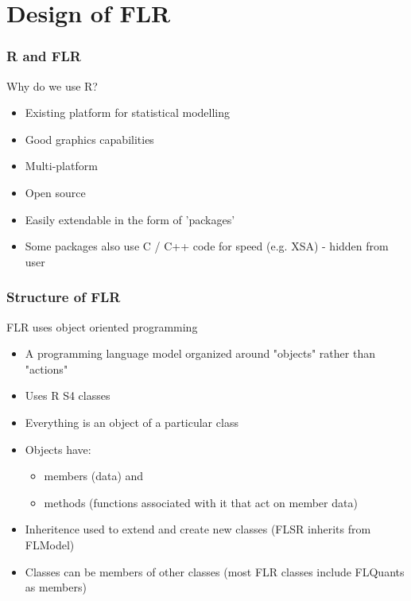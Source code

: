 \documentclass{beamer}%
\begin{document}
\section{Design of FLR}
\begin{frame}
  \frametitle{R and FLR}
Why do we use R?
      \begin{itemize}
	 \item<2-> Existing platform for statistical modelling
	 \item<3-> Good graphics capabilities
	 \item<4-> Multi-platform
	 \item<5-> Open source
	 \item<6-> Easily extendable in the form of 'packages'
	 \item<7-> Some packages also use C / C++ code for speed (e.g. XSA) - hidden from user
      \end{itemize}
\end{frame}

\begin{frame}
   \frametitle{Structure of FLR}
FLR uses object oriented programming
      \begin{itemize}
	 \item<2-> A programming language model organized around "objects" rather than "actions" 
	 \item<3-> Uses R S4 classes
	 \item<4-> Everything is an object of a particular class
	 \item<5-> Objects have: 
	 \begin{itemize}
	    \item<6-> members (data) and
	    \item<7-> methods (functions associated with it that act on member data)
	 \end{itemize}
	 \item<8-> Inheritence used to extend and create new classes (FLSR inherits from FLModel)
	 \item<9-> Classes can be members of other classes (most FLR classes include FLQuants as members)
      \end{itemize}
\end{frame}
\end{document}
